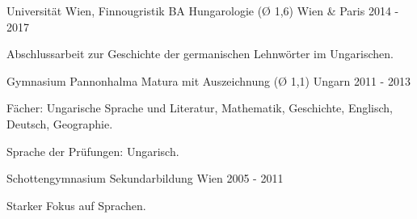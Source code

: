 \begin{cventries}
  \cventry
    {Universität Wien, Finnougristik} %
    {BA Hungarologie (Ø 1,6)} %
    {Wien \& Paris} %
    {2014 - 2017} %
    {
      \begin{cvitems} %
        \item {Abschlussarbeit zur Geschichte der germanischen Lehnwörter im Ungarischen.}
      \end{cvitems}
    }
        
  \cventry
    {Gymnasium Pannonhalma} %
    {Matura mit Auszeichnung (Ø 1,1)} %
    {Ungarn} %
    {2011 - 2013} %
    {
      \begin{cvitems} %
        \item {Fächer: Ungarische Sprache und Literatur, Mathematik, Geschichte, Englisch, Deutsch, Geographie.}
        \item{Sprache der Prüfungen: Ungarisch.}
      \end{cvitems}
    }

  \cventry    
    {Schottengymnasium} %
    {Sekundarbildung} %
    {Wien} %
    {2005 - 2011} %
    {
      \begin{cvitems} %
        \item {Starker Fokus auf Sprachen.}
      \end{cvitems}
    }
\end{cventries}
